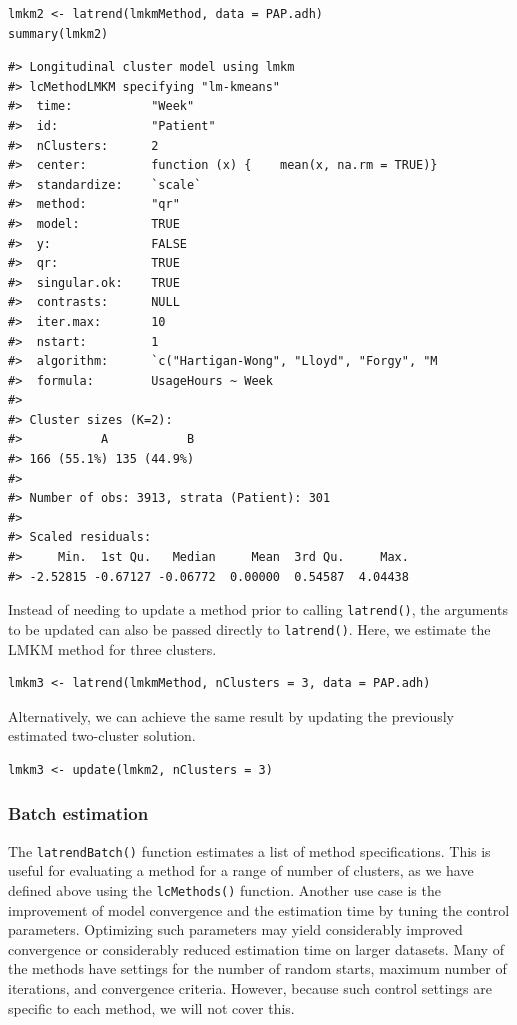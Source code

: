 \begin{verbatim}
lmkm2 <- latrend(lmkmMethod, data = PAP.adh)
summary(lmkm2)
\end{verbatim}

\begin{verbatim}
#> Longitudinal cluster model using lmkm
#> lcMethodLMKM specifying "lm-kmeans"
#>  time:           "Week"
#>  id:             "Patient"
#>  nClusters:      2
#>  center:         function (x) {    mean(x, na.rm = TRUE)}
#>  standardize:    `scale`
#>  method:         "qr"
#>  model:          TRUE
#>  y:              FALSE
#>  qr:             TRUE
#>  singular.ok:    TRUE
#>  contrasts:      NULL
#>  iter.max:       10
#>  nstart:         1
#>  algorithm:      `c("Hartigan-Wong", "Lloyd", "Forgy", "M
#>  formula:        UsageHours ~ Week
#> 
#> Cluster sizes (K=2):
#>           A           B 
#> 166 (55.1%) 135 (44.9%) 
#> 
#> Number of obs: 3913, strata (Patient): 301
#> 
#> Scaled residuals:
#>     Min.  1st Qu.   Median     Mean  3rd Qu.     Max. 
#> -2.52815 -0.67127 -0.06772  0.00000  0.54587  4.04438
\end{verbatim}

Instead of needing to update a method prior to calling \texttt{latrend()}, the arguments to be updated can also be passed directly to \texttt{latrend()}. Here, we estimate the LMKM method for three clusters.

\begin{verbatim}
lmkm3 <- latrend(lmkmMethod, nClusters = 3, data = PAP.adh)
\end{verbatim}

Alternatively, we can achieve the same result by updating the previously estimated two-cluster solution.

\begin{verbatim}
lmkm3 <- update(lmkm2, nClusters = 3)
\end{verbatim}

\subsubsection{Batch estimation}\label{batch-estimation}

The \texttt{latrendBatch()} function estimates a list of method specifications. This is useful for evaluating a method for a range of number of clusters, as we have defined above using the \texttt{lcMethods()} function. Another use case is the improvement of model convergence and the estimation time by tuning the control parameters. Optimizing such parameters may yield considerably improved convergence or considerably reduced estimation time on larger datasets. Many of the methods have settings for the number of random starts, maximum number of iterations, and convergence criteria. However, because such control settings are specific to each method, we will not cover this.

